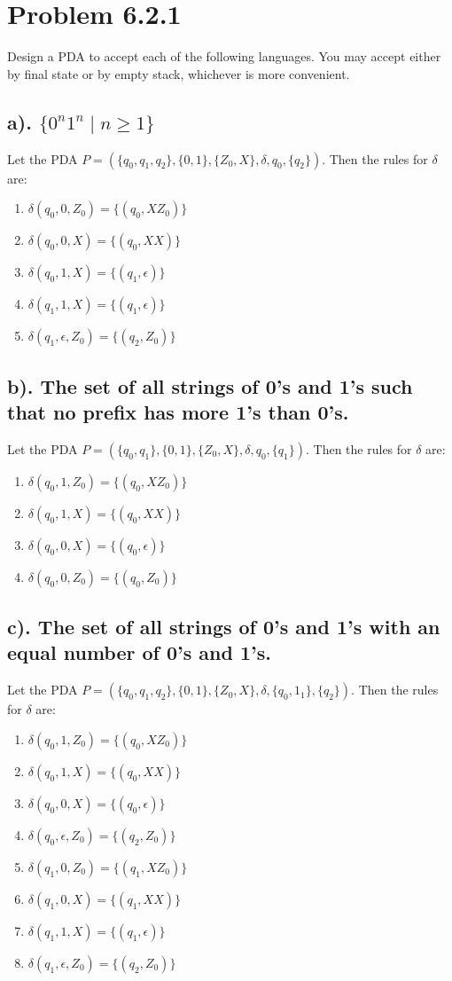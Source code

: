 \documentclass[20pt]{article} %
\begin{document}
\section{Problem 6.2.1}
Design a PDA to accept each of the following languages.  You may accept either by final state or by empty stack, whichever is more convenient.  
\subsection{a). $\{0^{n}1^{n} \mid n \geq 1\}$}
Let the PDA $\!P = (\{q_0, q_1, q_2\}, \{0,1\}, \{Z_0, X\}, \delta, q_0, \{q_2\})$. Then the rules for $\delta$ are: \\
\begin{enumerate}
\item $\delta(q_0, 0, Z_0) = \{(q_0, XZ_0)\}$
\item $\delta(q_0, 0, X) = \{(q_0, XX)\}$
\item $\delta(q_0, 1, X) = \{(q_1, \epsilon)\}$
\item $\delta(q_1, 1, X) = \{(q_1, \epsilon)\}$
\item $\delta(q_1, \epsilon, Z_0) = \{(q_2, Z_0)\}$
\end{enumerate}
\subsection{b). The set of all strings of 0's and 1's such that no prefix has more 1's than 0's.}
Let the PDA $\!P = (\{q_0, q_1\}, \{0,1\}, \{Z_0, X\}, \delta, q_0, \{q_1\})$. Then the rules for $\delta$ are: \\
\begin{enumerate}
\item $\delta(q_0, 1, Z_0) = \{(q_0, XZ_0)\}$
\item $\delta(q_0, 1, X) = \{(q_0, XX)\}$
\item $\delta(q_0, 0, X) = \{(q_0, \epsilon)\}$
\item $\delta(q_0, 0, Z_0) = \{(q_0, Z_0)\}$
\end{enumerate}
\newpage
\subsection{c). The set of all strings of 0's and 1's with an equal number of 0's and 1's.}
Let the PDA $\!P = (\{q_0, q_1, q_2\}, \{0,1\}, \{Z_0, X\}, \delta, \{q_0, 1_1\}, \{q_2\})$. Then the rules for $\delta$ are: \\
\begin{enumerate}
\item $\delta(q_0, 1, Z_0) = \{(q_0, XZ_0)\}$
\item $\delta(q_0, 1, X) = \{(q_0, XX)\}$
\item $\delta(q_0, 0, X) = \{(q_0, \epsilon)\}$
\item $\delta(q_0, \epsilon, Z_0) = \{(q_2, Z_0)\}$
\item $\delta(q_1, 0, Z_0) = \{(q_1, XZ_0)\}$
\item $\delta(q_1, 0, X) = \{(q_1, XX)\}$
\item $\delta(q_1, 1, X) = \{(q_1, \epsilon)\}$
\item $\delta(q_1, \epsilon, Z_0) = \{(q_2, Z_0)\}$
\end{enumerate}
\end{document}
